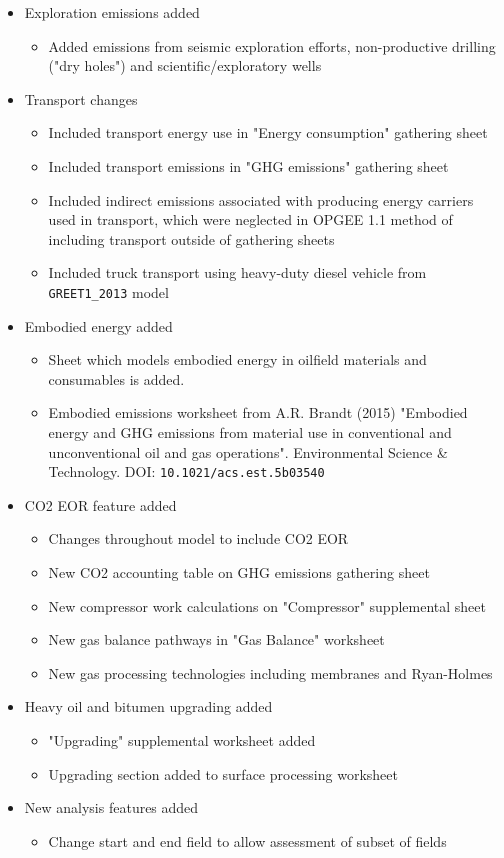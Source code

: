 \documentclass[11pt]{report}
\begin{document}
\begin{itemize}

\item Exploration emissions added	
	\begin{itemize}		
	\item Added emissions from seismic exploration efforts, non-productive drilling ("dry holes") and scientific/exploratory wells		
	\end{itemize}
\item Transport changes	
	\begin{itemize}			
	\item Included transport energy use in "Energy consumption" gathering sheet		
	\item Included transport emissions in "GHG emissions" gathering sheet		
	\item Included indirect emissions associated with producing energy carriers used in transport, which were neglected in OPGEE 1.1 method of including transport outside of gathering sheets		
	\item Included truck transport using heavy-duty diesel vehicle from \verb+GREET1_2013+ model		
	\end{itemize}	
\item Embodied energy added	
	\begin{itemize}			
	\item Sheet which models embodied energy in oilfield materials and consumables is added.		
	\item Embodied emissions worksheet from A.R. Brandt (2015) "Embodied energy and GHG emissions from material use in conventional and unconventional oil and gas operations". Environmental Science \& Technology. DOI: \verb+10.1021/acs.est.5b03540+		
	\end{itemize}	
\item CO2 EOR feature added	
	\begin{itemize}			
	\item Changes throughout model to include CO2 EOR		
	\item New CO2 accounting table on GHG emissions gathering sheet		
	\item New compressor work calculations on "Compressor" supplemental sheet		
	\item New gas balance pathways in "Gas Balance" worksheet		
	\item New gas processing technologies including membranes and Ryan-Holmes		
	\end{itemize}	
\item Heavy oil and bitumen upgrading added	
	\begin{itemize}			
	\item "Upgrading" supplemental worksheet added		
	\item Upgrading section added to surface processing worksheet		
	\end{itemize}	
\item New analysis features added	
	\begin{itemize}			
	\item Change start and end field to allow assessment of subset of fields		
	\end{itemize}
	
\end{itemize}	
\end{document}
